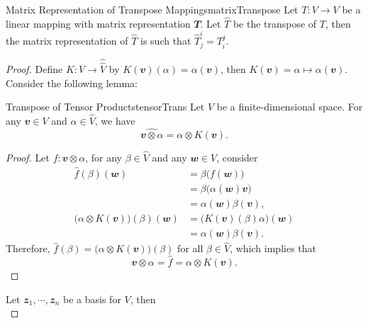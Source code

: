 \documentclass[math, code]{amznotes}
\theoremstyle{remark}
\begin{document}
\begin{probox}{Matrix Representation of Transpose Mappings}{matrixTranspose}
    Let $T \colon V \to V$ be a linear mapping with matrix representation $\mathbfit{T}$. Let $\hat{T}$ be the transpose of $T$, then the matrix representation of $\hat{T}$ is such that $\hat{T}^{i}_j = T^j_i$.
    \tcblower
    \begin{proof}
        Define $K \colon V \to \hat{\hat{V}}$ by $K(\mathbfit{v})(\alpha) = \alpha(\mathbfit{v})$, then $K(\mathbfit{v}) = \alpha \mapsto \alpha(\mathbfit{v})$. Consider the following lemma:
        \begin{lembox}{Transpose of Tensor Products}{tensorTrans}
            Let $V$ be a finite-dimensional space. For any $\mathbfit{v} \in V$ and $\alpha \in \hat{V}$, we have 
            \begin{equation*}
                \widehat{\mathbfit{v} \otimes \alpha} = \alpha \otimes K(\mathbfit{v}).
            \end{equation*}
            \tcblower
            \begin{proof}
                Let $f \colon \mathbfit{v} \otimes \alpha$, for any $\beta \in \hat{V}$ and any $\mathbfit{w} \in V$, consider 
                \begin{align*}
                    \hat{f}(\beta)(\mathbfit{w}) & = \beta\bigl(f(\mathbfit{w})\bigr) \\
                    & = \beta\bigl(\alpha(\mathbfit{w})\mathbfit{v}\bigr) \\
                    & = \alpha(\mathbfit{w})\beta(\mathbfit{v}), \\
                    \bigl(\alpha \otimes K(\mathbfit{v})\bigr)(\beta)(\mathbfit{w}) & = \bigl(K(\mathbfit{v})(\beta)\alpha\bigr)(\mathbfit{w}) \\
                    & = \alpha(\mathbfit{w})\beta(\mathbfit{v}).
                \end{align*}     
                Therefore, $\hat{f}(\beta) =  \bigl(\alpha \otimes K(\mathbfit{v})\bigr)(\beta)$ for all $\beta \in \hat{V}$, which implies that 
                \begin{equation*}
                    \mathbfit{v} \otimes \alpha = \hat{f} = \alpha \otimes K(\mathbfit{v}).
                \end{equation*}
            \end{proof}
        \end{lembox}
        Let $\mathbfit{z}_1, \cdots, \mathbfit{z}_n$ be a basis for $V$, then 
        \begin{equation*}

\end{equation*}
\end{proof}
\end{probox}
\end{document}
